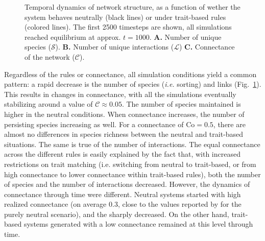 \documentclass[10pt,twocolumn,fleqn]{article}
\begin{document}
\begin{figure}[tb]
\begin{center}
	\end{center}
	\caption{Temporal dynamics of network structure, as a function of wether the system behaves neutrally (black lines) or under trait-based rules (colored lines). The first 2500 timesteps are shown, all simulations reached equilibrium at approx. $t = 1000$. \textbf{A.} Number of unique species ($\mathcal{S}$). \textbf{B.} Number of unique interactions ($\mathcal{L}$) \textbf{C.} Connectance of the network ($\mathcal{C}$).}
	\label{f:comdyn}
\end{figure}

Regardless of the rules or connectance, all simulation conditions yield a common
pattern: a rapid decrease is the number of species (\emph{i.e.} sorting) and
links (Fig.~\ref{f:comdyn}). This results in changes in connectance, with all
the simulations eventually stabilizing around a value of $\mathcal{C}\approx
0.05$. The number of species maintained is higher in the neutral conditions.
When connectance increases, the number of persisting species increasing as well.
For a connectance of $\mathrm{Co} = 0.5$, there are almost no differences in
species richness between the neutral and trait-based situations. The same is
true of the number of interactions. The equal connectance across the different
rules is easily explained by the fact that, with increased restrictions on trait
matching (i.e. switching from neutral to trait-based, or from high connectance
to lower connectance within trait-based rules), both the number of species and
the number of interactions decreased. However, the dynamics of connectance
through time were different. Neutral systems started with high realized
connectance (on average 0.3, close to the values reported by
\citet{canard_emergence_2012} for the purely neutral scenario), and the sharply
decreased. On the other hand, trait-based systems generated with a low
connectance remained at this level through time.
\end{document}
